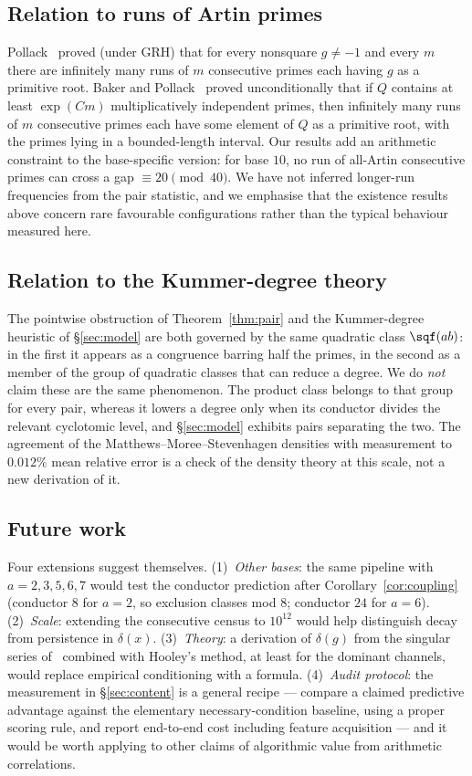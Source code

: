 \subsection*{Relation to runs of Artin primes}
Pollack~\cite{Pollack2014} proved (under GRH) that for every nonsquare $g\neq-1$ and every
$m$ there are infinitely many runs of $m$ consecutive primes each having $g$ as a primitive
root. Baker and Pollack~\cite{BakerPollack2016} proved unconditionally that if $Q$ contains
at least $\exp(Cm)$ multiplicatively independent primes, then infinitely many runs of $m$
consecutive primes each have some element of $Q$ as a primitive root, with the primes lying
in a bounded-length interval. Our results add an arithmetic constraint to the base-specific
version: for base $10$, no run of all-Artin consecutive primes can cross a gap
$\equiv 20 \pmod{40}$. We have not inferred longer-run frequencies from the pair statistic,
and we emphasise that the existence results above concern rare favourable configurations
rather than the typical behaviour measured here.

\subsection*{Relation to the Kummer-degree theory}
The pointwise obstruction of Theorem~\ref{thm:pair} and the Kummer-degree heuristic of
\S\ref{sec:model} are both governed by the same quadratic class $\sqf(ab)$: in the first it
appears as a congruence barring half the primes, in the second as a member of the group of
quadratic classes that can reduce a degree. We do \emph{not} claim these are the same
phenomenon. The product class belongs to that group for every pair, whereas it lowers a
degree only when its conductor divides the relevant cyclotomic level, and
\S\ref{sec:model} exhibits pairs separating the two. The agreement of the
Matthews--Moree--Stevenhagen densities with measurement to $0.012\%$ mean relative error is
a check of the density theory at this scale, not a new derivation of it.

\subsection*{Future work}
Four extensions suggest themselves. (1)~\emph{Other bases}: the same pipeline with
$a=2,3,5,6,7$ would test the conductor prediction after Corollary~\ref{cor:coupling}
(conductor $8$ for $a=2$, so exclusion classes mod $8$; conductor $24$ for $a=6$).
(2)~\emph{Scale}: extending the consecutive census to $10^{12}$ would help distinguish decay
from persistence in $\delta(x)$. (3)~\emph{Theory}: a derivation of $\delta(g)$ from the
singular series of~\cite{HardyLittlewood1923} combined with Hooley's method, at least for
the dominant channels, would replace empirical conditioning with a formula. (4)~\emph{Audit
protocol}: the measurement in \S\ref{sec:content} is a general recipe --- compare a claimed
predictive advantage against the elementary necessary-condition baseline, using a proper
scoring rule, and report end-to-end cost including feature acquisition --- and it would be
worth applying to other claims of algorithmic value from arithmetic correlations.

